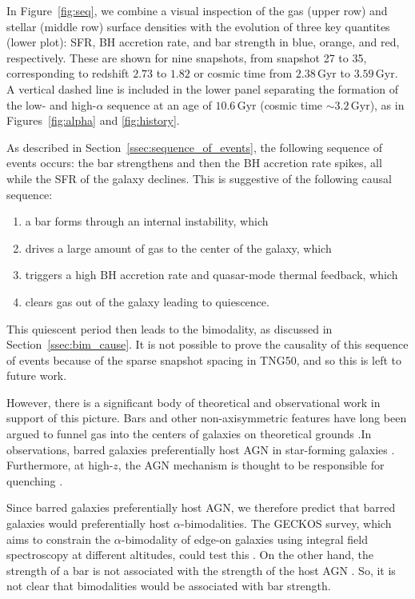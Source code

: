 \documentclass[twocolumn]{aastex631}
\newcommand{\Gyr}{\ensuremath{\textrm{Gyr}}}
\begin{document}
In Figure~\ref{fig:seq}, we combine a visual inspection of the gas (upper row) and stellar (middle row) surface densities with the evolution of three key quantites (lower plot): SFR, BH accretion rate, and bar strength in blue, orange, and red, respectively. These are shown for nine snapshots, from snapshot 27 to 35, corresponding to redshift $2.73$ to $1.82$ or cosmic time from $2.38\,\Gyr$ to $3.59\,\Gyr$. A vertical dashed line is included in the lower panel separating the formation of the low- and high-$\alpha$ sequence at an age of $10.6\,\Gyr$ (cosmic time $\sim3.2\,\Gyr$), as in Figures~\ref{fig:alpha} and \ref{fig:history}.

As described in Section~\ref{ssec:sequence_of_events}, the following sequence of events occurs: the bar strengthens and then the BH accretion rate spikes, all while the SFR of the galaxy declines. This is suggestive of the following causal sequence:
\begin{enumerate}
  \item a bar forms through an internal instability, which
  \item drives a large amount of gas to the center of the galaxy, which
  \item triggers a high BH accretion rate and quasar-mode thermal feedback, which
  \item clears gas out of the galaxy leading to quiescence.
\end{enumerate}
This quiescent period then leads to the bimodality, as discussed in Section~\ref{ssec:bim_cause}. It is not possible to prove the causality of this sequence of events because of the sparse snapshot spacing in TNG50, and so this is left to future work.

However, there is a significant body of theoretical and observational work in support of this picture. Bars and other non-axisymmetric features have long been argued to funnel gas into the centers of galaxies on theoretical grounds \citep{1989Natur.338...45S,2010MNRAS.407.1529H}.In observations, barred galaxies preferentially host AGN in star-forming galaxies \citep{2012ApJS..198....4O,2022A&A...661A.105S}. Furthermore, at high-$z$, the AGN mechanism is thought to be responsible for quenching \citep[e.g.][and references therein]{2023arXiv230806317D,2024arXiv240417945P,2024arXiv240518685M,2024Natur.630...54B}.

Since barred galaxies preferentially host AGN, we therefore predict that barred galaxies would preferentially host $\alpha$-bimodalities. The GECKOS survey, which aims to constrain the $\alpha$-bimodality of edge-on galaxies using integral field spectroscopy at different altitudes, could test this \citep{2024IAUS..377...27V}. On the other hand, the strength of a bar is not associated with the strength of the host AGN \citep[e.g.]{2022A&A...661A.105S}. So, it is not clear that bimodalities would be associated with bar strength.
\end{document}
